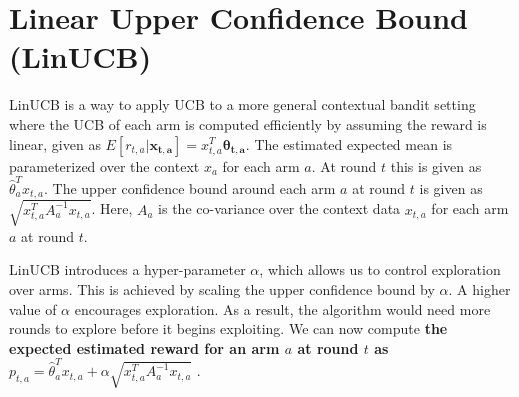 \section{Linear Upper Confidence Bound (LinUCB) \label{chap2:linUCB}}

LinUCB is a way to apply UCB to a more general contextual bandit setting where the UCB of each arm is computed efficiently by assuming the reward is linear, given as $E[r_{t,a}|\mathbf{x_{t,a}}] = x^{T}_{t,a}\mathbf{\theta_{t,a}}$. The estimated expected mean is parameterized over the context $x_{a}$ for each arm $a$. At round $t$ this is given as $\widehat{\theta}^{T}_{a}x_{t,a}$. The upper confidence bound around each arm $a$ at round $t$ is given as $\sqrt{x^{T}_{t,a}A^{-1}_{a}x_{t,a}}$. Here, $A_a$ is the co-variance over the context data $x_{t,a}$ for each arm $a$ at round $t$.  \par

LinUCB introduces a hyper-parameter $\alpha$, which allows us to control exploration over arms. This is achieved by scaling the upper confidence bound by $\alpha$. A higher value of $\alpha$ encourages exploration. As a result, the algorithm would need more rounds to explore before it begins exploiting. We can now compute \textbf{the expected estimated reward for an arm $a$ at round $t$ as $p_{t,a} = \widehat{\theta}^{T}_{a}x_{t,a} + {\alpha} \sqrt{x^{T}_{t,a}A^{-1}_{a}x_{t,a}}$}  \cite{li2010contextual}.\par
